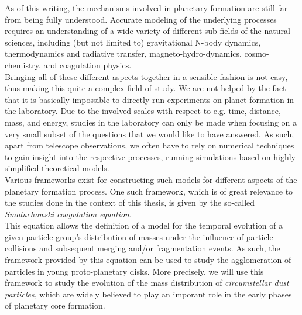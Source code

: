 
As of this writing, the mechanisms involved in planetary formation are still far from being fully 
understood. Accurate modeling of the underlying processes requires an understanding of a wide 
variety of different sub-fields of the natural sciences, 
including (but not limited to)
gravitational N-body dynamics,
thermodynamics and radiative transfer,
magneto-hydro-dynamics,
cosmo-chemistry, and 
coagulation physics. \\

Bringing all of these different aspects %
together in a sensible fashion is not easy,
thus making this quite a complex field of study. 
We are not helped by the fact that it is basically impossible to directly run experiments 
on planet formation in the laboratory. Due to the involved scales with respect to e.g. 
time, distance, mass, and energy,
studies in the laboratory can only be made when focusing on a very small subset of the 
questions that we would like to have answered.
As such, apart from telescope observations, we often have to rely on numerical techniques to gain 
insight into the respective processes, running simulations based on highly simplified theoretical 
models. \\

Various frameworks exist for constructing such models for different aspects of the planetary 
formation process. 
One such framework, which is of great relevance to the studies done in the context of this thesis,
is given by the so-called \textit{Smoluchowski coagulation equation}. \\

This equation allows the definition of a model for the temporal evolution of a given particle 
group's distribution of masses under the influence of particle collisions and subsequent 
merging and/or fragmentation events. 
As such, the framework provided by this equation can be used to study the agglomeration of
particles in young proto-planetary disks. More precisely, we will use this framework to study the 
evolution of the mass distribution of \textit{circumstellar dust particles},
which are widely believed to play an imporant role in the early phases of planetary core 
formation. \\

